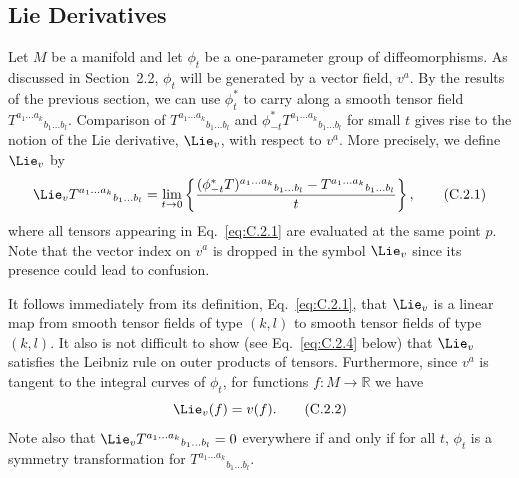 
\subsection{Lie Derivatives}\label{sec:C.2}

Let \(M\) be a manifold and let \(\phi_t\) be a one-parameter group of
diffeomorphisms. As discussed in Section~2.2, \(\phi_t\) will be generated by a
vector field, \(v^a\). By the results of the previous section, we can use
\(\phi_t^*\) to carry along a smooth tensor field
\(T^{a_1\ldots a_k}{}_{b_1\ldots b_l}\). Comparison of
\(T^{a_1\ldots a_k}{}_{b_1\ldots b_l}\) and
\(\phi_{-t}^*T^{a_1\ldots a_k}{}_{b_1\ldots b_l}\) for small \(t\) gives rise to
the notion of the Lie derivative, \(\Lie_v\), with respect to \(v^a\). More
precisely, we define \(\Lie_v\) by
\begin{equation}
  \Lie_vT^{a_1\ldots a_k}{}_{b_1\ldots b_l}
  =\lim_{t\to0}\left\{
    \frac{(\phi_{-t}^*T)^{a_1\ldots a_k}{}_{b_1\ldots b_l}
    -T^{a_1\ldots a_k}{}_{b_1\ldots b_l}}{t}
  \right\},
  \tag{C.2.1}\label{eq:C.2.1}
\end{equation}
where all tensors appearing in Eq.~\eqref{eq:C.2.1} are evaluated at the same point
\(p\). Note that the vector index on \(v^a\) is dropped in the symbol \(\Lie_v\)
since its presence could lead to confusion.

It follows immediately from its definition, Eq.~\eqref{eq:C.2.1}, that \(\Lie_v\)
is a linear map from smooth tensor fields of type \((k,l)\) to smooth tensor fields of
type \((k,l)\). It also is not difficult to show (see Eq.~\eqref{eq:C.2.4} below)
that \(\Lie_v\) satisfies the Leibniz rule on outer products of tensors. Furthermore,
since \(v^a\) is tangent to the integral curves of \(\phi_t\), for functions
\(f:M\to\mathbb R\) we have
\begin{equation}
  \Lie_v(f)=v(f).
  \tag{C.2.2}\label{eq:C.2.2}
\end{equation}
Note also that
\(\Lie_vT^{a_1\ldots a_k}{}_{b_1\ldots b_l}=0\) everywhere if and only if for all
\(t\), \(\phi_t\) is a symmetry transformation for
\(T^{a_1\ldots a_k}{}_{b_1\ldots b_l}\).

